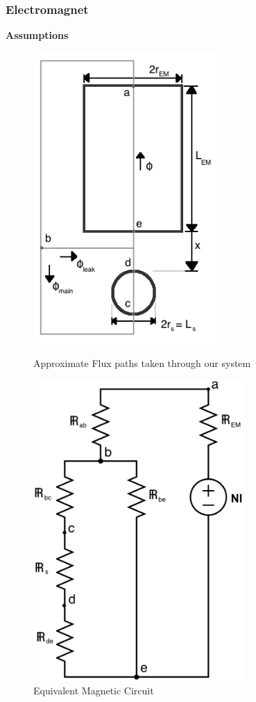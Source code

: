 \documentclass{article}
\theoremstyle{plain}
\theoremstyle{definition}
\theoremstyle{remark}
\begin{document}
\subsubsection*{Electromagnet}
\textbf{Assumptions}

\begin{figure}[htb]
\begin{minipage}[b]{0.45\linewidth}
\centering
\includegraphics[width = 7cm]{flux_diagram.png}
\caption{Approximate Flux paths taken through our system}
\label{Q1_a3L}
\end{minipage}
\hspace{0.5cm}
\begin{minipage}[b]{0.45\linewidth}
\centering
\includegraphics[width = 8cm]{magnetic_circuit.png}
\caption{Equivalent Magnetic Circuit}
\label{Q1_a3R}
\end{minipage}
\end{figure}
\end{document}
